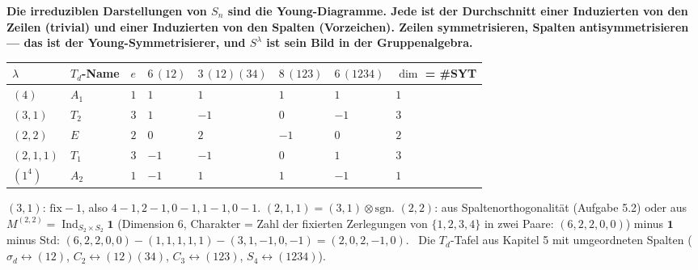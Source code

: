 \begin{merksatz}
\begin{center}
\begin{minipage}{0.9\textwidth}
\textbf{Die irreduziblen Darstellungen von $S_n$ sind die Young-Diagramme. Jede ist der Durchschnitt einer Induzierten von den Zeilen (trivial) und einer Induzierten von den Spalten (Vorzeichen). Zeilen symmetrisieren, Spalten antisymmetrisieren --- das ist der Young-Symmetrisierer, und $S^{\lambda}$ ist sein Bild in der Gruppenalgebra.}
\end{minipage}
\end{center}
\end{merksatz}

\begin{merksatz}
\begin{center}
{\small
\renewcommand{\arraystretch}{1.5}
\begin{tabular}{@{}P{1.4cm}P{1.3cm}P{0.6cm}P{1.0cm}P{1.6cm}P{1.1cm}P{1.3cm}P{1.5cm}@{}}
\toprule
$\lambda$ & $T_d$-Name & $e$ & $6\,(12)$ & $3\,(12)(34)$ & $8\,(123)$ & $6\,(1234)$ & $\dim$ = \#SYT\\
\midrule
$(4)$ & $A_1$ & $1$ & $1$ & $1$ & $1$ & $1$ & $1$\\
$(3, 1)$ & $T_2$ & $3$ & $1$ & $-1$ & $0$ & $-1$ & $3$\\
$(2, 2)$ & $E$ & $2$ & $0$ & $2$ & $-1$ & $0$ & $2$\\
$(2, 1, 1)$ & $T_1$ & $3$ & $-1$ & $-1$ & $0$ & $1$ & $3$\\
$(1^{4})$ & $A_2$ & $1$ & $-1$ & $1$ & $1$ & $-1$ & $1$\\
\bottomrule
\end{tabular}}
\end{center}
$(3, 1)$: $\mathrm{fix} - 1$, also $4 - 1, 2 - 1, 0 - 1, 1 - 1, 0 - 1$. $(2, 1, 1) = (3, 1)\otimes\mathrm{sgn}$. $(2, 2)$: aus Spaltenorthogonalität (Aufgabe 5.2) oder aus $M^{(2,2)} = \operatorname{Ind}_{S_2\times S_2}\mathbf 1$ (Dimension $6$, Charakter = Zahl der fixierten Zerlegungen von $\{1, 2, 3, 4\}$ in zwei Paare: $(6, 2, 2, 0, 0)$) minus $\mathbf 1$ minus $\mathrm{Std}$: $(6, 2, 2, 0, 0) - (1, 1, 1, 1, 1) - (3, 1, -1, 0, -1) = (2, 0, 2, -1, 0)$. \checkmark\ Die $T_d$-Tafel aus Kapitel 5 mit umgeordneten Spalten ($\sigma_d\leftrightarrow(12)$, $C_2\leftrightarrow(12)(34)$, $C_3\leftrightarrow(123)$, $S_4\leftrightarrow(1234)$). \checkmark

\begin{center}
\begin{minipage}{0.88\textwidth}
\end{minipage}
\end{center}
\end{merksatz}

